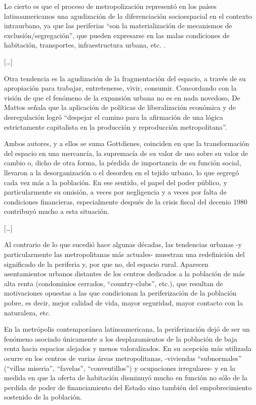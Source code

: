   Lo cierto es que el proceso de metropolización representó en los países latinoamericanos una
  agudización de la diferenciación socioespacial en el contexto intraurbano, ya que las periferias
  ``son la materialización de mecanismos de exclusión/segregación'', que pueden expresarse en las
  malas condiciones de habitación, transportes, infraestructura urbana, etc. \cite{Pav96}.

  [\ldots]

  Otra tendencia es la agudización de la fragmentación del espacio, a través de su apropiación para
  trabajar, entretenerse, vivir, consumir. Concordando con la visión de que el
  fenómeno de la expansión urbana no es en nada novedoso, De Mattos señala que la aplicación de
  políticas de liberalización económica y de desregulación logró ``despejar el camino para la
  afirmación de una lógica estrictamente capitalista en la producción y reproducción metropolitana''.

  Ambos autores, y a ellos se suma Gottdienes, coinciden en que la transformación del espacio en una
  mercancía, la supremacía de su valor de uso sobre su valor de cambio 
  o, dicho de otra forma, la pérdida de importancia de su función social, llevaron a la
  desorganización o el desorden en el tejido urbano, lo que segregó cada vez más a la población. En
  ese sentido, el papel del poder público, y particularmente su omisión, a veces por negligencia y a
  veces por falta de condiciones financieras, especialmente después de la crisis fiscal del decenio
  1980 contribuyó mucho a esta situación.

  [\ldots]
  
  Al contrario de lo que sucedió hace algunas décadas, las tendencias urbanas -y particularmente las
  metropolitanas más actuales- muestran una redefinición del significado de la periferia y, por que
  no, del espacio rural. Aparecen asentamientos urbanos distantes de los centros dedicados a la
  población de más alta renta (condominios cerrados, ``country-clubs'', etc.), que resultan de
  motivaciones opuestas a las que condicionan la periferización de la población pobre, es decir, mejor
  calidad de vida, mayor seguridad, mayor contacto con la naturaleza, etc.

  En la metrópolis contemporánea latinoamericana, la periferización dejó de ser un fenómeno asociado
  únicamente a los desplazamientos de la población de baja renta hacia espacios alejados y menos
  valoralizados. En su acepción más utilizada ocurre en los centros de varias áreas metropolitanas,
  -viviendas ``subnormales'' (``villas miseria'', ``favelas'', ``conventillos'') y ocupaciones
  irregulares- y en la medida en que la oferta de habitación disminuyó mucho en función no sólo de la
  perdida de poder de financiamiento del Estado sino también del empobrecimiento sostenido de la
  población.

